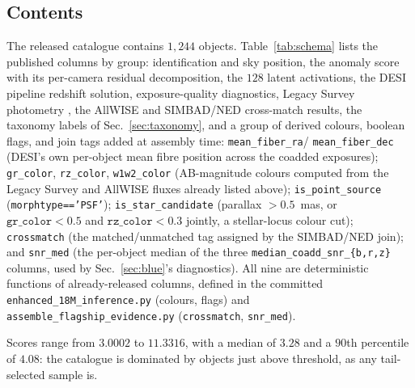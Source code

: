 \documentclass[aps,prd,twocolumn,superscriptaddress,nofootinbib,longbibliography,floatfix]{revtex4-2}
\begin{document}
\subsection{Contents}
The released catalogue contains $1{,}244$ objects. Table~\ref{tab:schema}
lists the published columns by group: identification and sky position, the
anomaly score with its per-camera residual decomposition, the $128$ latent
activations, the DESI pipeline redshift solution, exposure-quality
diagnostics, Legacy Survey photometry \cite{LegacySurveys}, the AllWISE
\cite{AllWISE} and SIMBAD/NED cross-match results, the taxonomy labels of
Sec.~\ref{sec:taxonomy}, and a group of derived colours, boolean flags, and
join tags added at assembly time: \texttt{mean\_fiber\_ra}/
\texttt{mean\_fiber\_dec} (DESI's own per-object mean fibre position across
the coadded exposures); \texttt{gr\_color}, \texttt{rz\_color},
\texttt{w1w2\_color} (AB-magnitude colours computed from the Legacy Survey
and AllWISE fluxes already listed above); \texttt{is\_point\_source}
(\texttt{morphtype}\texttt{==}\texttt{'PSF'}); \texttt{is\_star\_candidate}
(parallax $>0.5$~mas, or $\texttt{gr\_color}<0.5$ and
$\texttt{rz\_color}<0.3$ jointly, a stellar-locus colour cut);
\texttt{crossmatch} (the matched/unmatched tag assigned by the SIMBAD/NED
join); and \texttt{snr\_med} (the per-object median of the three
\texttt{median\_coadd\_snr\_\{b,r,z\}} columns, used by
Sec.~\ref{sec:blue}'s diagnostics). All nine are deterministic functions of
already-released columns, defined in the committed
\texttt{enhanced\_18M\_inference.py} (colours, flags) and
\texttt{assemble\_flagship\_evidence.py} (\texttt{crossmatch},
\texttt{snr\_med}).

\begin{table}[t]
\caption{Released column schema, by group: all 192 released columns
accounted for. \texttt{classification} and \texttt{discovery\_potential} are
constant placeholders across all 1,244 rows, listed rather than dropped so
the schema stays honest about what is not yet populated.}
\label{tab:schema}

\end{table}

Scores range from $3.0002$ to $11.3316$, with a median of $3.28$ and a
$90$th percentile of $4.08$:
the catalogue is dominated by objects just above threshold, as any
tail-selected sample is.
\end{document}
